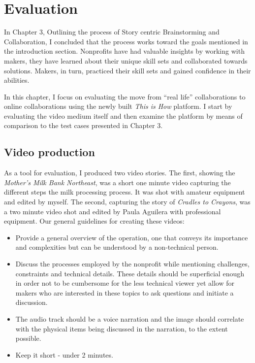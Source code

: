\chapter{Evaluation}
\label{chap_eval}

In Chapter 3, Outlining the process of Story centric Brainstorming and Collaboration, I concluded that the process works toward the goals mentioned in the introduction section. Nonprofits have had valuable insights by working with makers, they have learned about their unique skill sets and collaborated towards solutions. Makers, in turn, practiced their skill sets and gained confidence in their abilities.

In this chapter, I focus on evaluating the move from ``real life'' collaborations to online collaborations using the newly built \textit{This is How} platform. I start by evaluating the video medium itself and then examine the platform by means of comparison to the test cases presented in Chapter 3.

\section{Video production} As a tool for evaluation, I produced two video stories. The first, showing the \textit{Mother's Milk Bank Northeast}, was a short one minute video capturing the different steps the milk processing process. It was shot with amateur equipment and edited by myself. The second, capturing the story of \textit{Cradles to Crayons}, was a two minute video shot and edited by Paula Aguilera with professional equipment. Our general guidelines for creating these videos: 

\begin{itemize}
   \item Provide a general overview of the operation, one that conveys its importance and complexities but can be understood by a non-technical person.   
   \item Discuss the processes employed by the nonprofit while mentioning challenges, constraints and technical details. These details should be superficial enough in order not to be cumbersome for the less technical viewer yet allow for makers who are interested in these topics to ask questions and initiate a discussion.
   \item The audio track should be a voice narration and the image should correlate with the physical items being discussed in the narration, to the extent possible. 
   \item Keep it short - under 2 minutes. 
\end{itemize}

